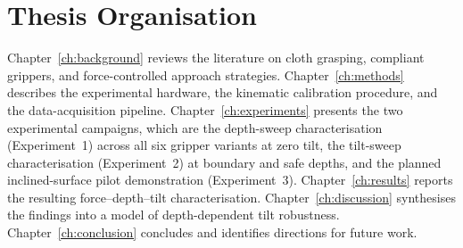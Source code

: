 \section{Thesis Organisation}

Chapter~\ref{ch:background} reviews the literature on cloth grasping,
compliant grippers, and force-controlled approach strategies.
Chapter~\ref{ch:methods} describes the experimental hardware, the kinematic
calibration procedure, and the data-acquisition pipeline.
Chapter~\ref{ch:experiments} presents the two experimental campaigns,
which are the depth-sweep characterisation (Experiment~1) across all six
gripper variants at zero tilt, the tilt-sweep characterisation
(Experiment~2) at boundary and safe depths, and the planned
inclined-surface pilot demonstration (Experiment~3).
Chapter~\ref{ch:results} reports the resulting force--depth--tilt
characterisation.
Chapter~\ref{ch:discussion} synthesises the findings into a model of
depth-dependent tilt robustness.
Chapter~\ref{ch:conclusion} concludes and identifies directions for future work.
